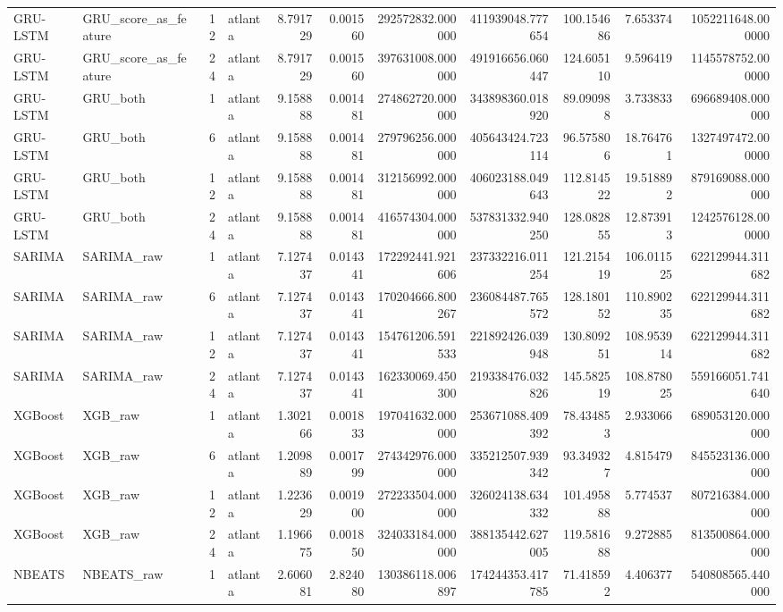 \begin{longtable}{llrlrrrrrrr}
GRU-LSTM & GRU\_score\_as\_feature & 12 & atlanta & 8.791729 & 0.001560 & 292572832.000000 & 411939048.777654 & 100.154686 & 7.653374 & 1052211648.000000 \\
GRU-LSTM & GRU\_score\_as\_feature & 24 & atlanta & 8.791729 & 0.001560 & 397631008.000000 & 491916656.060447 & 124.605110 & 9.596419 & 1145578752.000000 \\
GRU-LSTM & GRU\_both & 1 & atlanta & 9.158888 & 0.001481 & 274862720.000000 & 343898360.018920 & 89.090988 & 3.733833 & 696689408.000000 \\
GRU-LSTM & GRU\_both & 6 & atlanta & 9.158888 & 0.001481 & 279796256.000000 & 405643424.723114 & 96.575806 & 18.764761 & 1327497472.000000 \\
GRU-LSTM & GRU\_both & 12 & atlanta & 9.158888 & 0.001481 & 312156992.000000 & 406023188.049643 & 112.814522 & 19.518892 & 879169088.000000 \\
GRU-LSTM & GRU\_both & 24 & atlanta & 9.158888 & 0.001481 & 416574304.000000 & 537831332.940250 & 128.082855 & 12.873913 & 1242576128.000000 \\
SARIMA & SARIMA\_raw & 1 & atlanta & 7.127437 & 0.014341 & 172292441.921606 & 237332216.011254 & 121.215419 & 106.011525 & 622129944.311682 \\
SARIMA & SARIMA\_raw & 6 & atlanta & 7.127437 & 0.014341 & 170204666.800267 & 236084487.765572 & 128.180152 & 110.890235 & 622129944.311682 \\
SARIMA & SARIMA\_raw & 12 & atlanta & 7.127437 & 0.014341 & 154761206.591533 & 221892426.039948 & 130.809251 & 108.953914 & 622129944.311682 \\
SARIMA & SARIMA\_raw & 24 & atlanta & 7.127437 & 0.014341 & 162330069.450300 & 219338476.032826 & 145.582519 & 108.878025 & 559166051.741640 \\
XGBoost & XGB\_raw & 1 & atlanta & 1.302166 & 0.001833 & 197041632.000000 & 253671088.409392 & 78.434853 & 2.933066 & 689053120.000000 \\
XGBoost & XGB\_raw & 6 & atlanta & 1.209889 & 0.001799 & 274342976.000000 & 335212507.939342 & 93.349327 & 4.815479 & 845523136.000000 \\
XGBoost & XGB\_raw & 12 & atlanta & 1.223629 & 0.001900 & 272233504.000000 & 326024138.634332 & 101.495888 & 5.774537 & 807216384.000000 \\
XGBoost & XGB\_raw & 24 & atlanta & 1.196675 & 0.001850 & 324033184.000000 & 388135442.627005 & 119.581688 & 9.272885 & 813500864.000000 \\
NBEATS & NBEATS\_raw & 1 & atlanta & 2.606081 & 2.824080 & 130386118.006897 & 174244353.417785 & 71.418592 & 4.406377 & 540808565.440000 \\

\end{longtable}
